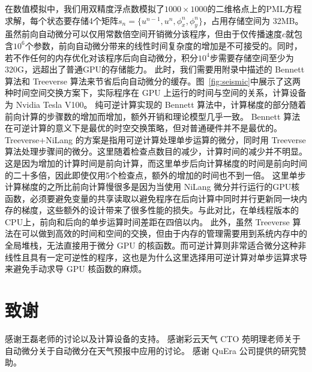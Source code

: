 \documentclass[A4,twoside,UTF8]{ctexart}
\begin{document}
在数值模拟中，我们用双精度浮点数模拟了$1000 \times 1000$的二维格点上的PML方程求解，每个状态要存储4个矩阵$s_n = \{u^{n-1}, u^n, \phi_x^n, \phi_y^n\}$，占用存储空间为 32MB。
虽然前向自动微分可以仅用常数倍空间开销微分该程序，但由于仅传播速度$c$就包含$10^6$个参数，前向自动微分带来的线性时间复杂度的增加是不可接受的。同时，若不作任何的内存优化对该程序后向自动微分，积分$10^4$步需要存储空间至少为320G，远超出了普通GPU的存储能力。
此时，我们需要用附录中描述的 Bennett 算法和 Treeverse 算法来节省后向自动微分的缓存。图~\ref{fig:seismic}中展示了这两种时间空间交换方案下，实际程序在 GPU 上运行的时间与空间的关系，计算设备为 Nvidia Tesla V100。
纯可逆计算实现的 Bennett 算法中，计算梯度的部分随着前向计算的步骤数的增加而增加，额外开销和理论模型几乎一致。
Bennett 算法在可逆计算的意义下是最优的时空交换策略，但对普通硬件并不是最优的。
Treeverse+NiLang 的方案是指用可逆计算处理单步运算的微分，同时用 Treeverse 算法处理步骤间的微分。这里随着检查点数目的减少，计算时间的减少并不明显。这是因为增加的计算时间是前向计算，而这里单步后向计算梯度的时间是前向时间的二十多倍，因此即使仅用5个检查点，额外的增加的时间也不到一倍。
这里单步计算梯度的之所比前向计算慢很多是因为当使用 NiLang 微分并行运行的GPU核函数，必须要避免变量的共享读取以避免程序在后向计算中同时并行更新同一块内存的梯度，这些额外的设计带来了很多性能的损失。与此对比，在单线程版本的CPU上，前向和后向的单步运算时间差距在四倍以内。
此外，虽然 Treeverse 算法在可以做到高效的时间和空间的交换，但由于内存的管理需要用到系统内存中的全局堆栈，无法直接用于微分 GPU 的核函数。而可逆计算则非常适合微分这种非线性且具有一定可逆性的程序，这也是为什么这里选择用可逆计算对单步运算求导来避免手动求导 GPU 核函数的麻烦。

\section*{致谢}

感谢王磊老师的讨论以及计算设备的支持。
感谢彩云天气 CTO 苑明理老师关于自动微分关于自动微分在天气预报中应用的讨论。
感谢 QuEra 公司提供的研究赞助。

\appendix
\end{document}
